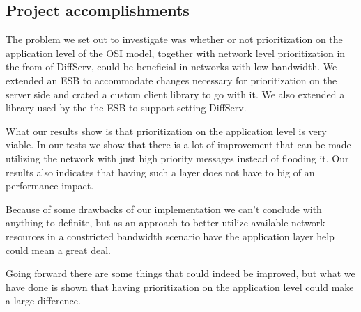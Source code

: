\subsection{Project accomplishments}\label{Project accomplishments}
	The problem we set out to investigate was whether or not prioritization on the application level of the OSI model, together with network level prioritization in the from of DiffServ, could be beneficial in networks with low bandwidth. We extended an ESB to accommodate changes necessary for prioritization on the server side and crated a custom client library to go with it. We also extended a library used by the the ESB to support setting DiffServ.
	
	What our results show is that prioritization on the application level is very viable. In our tests we show that there is a lot of improvement that can be made utilizing the network with just high priority messages instead of flooding it. Our results also indicates that having such a layer does not have to big of an performance impact.
	
	Because of some drawbacks of our implementation we can't conclude with anything to definite, but as an approach to better utilize available network resources in a constricted bandwidth scenario have the application layer help could mean a great deal.
	
	Going forward there are some things that could indeed be improved, but what we have done is shown that having prioritization on the application level could make a large difference.
